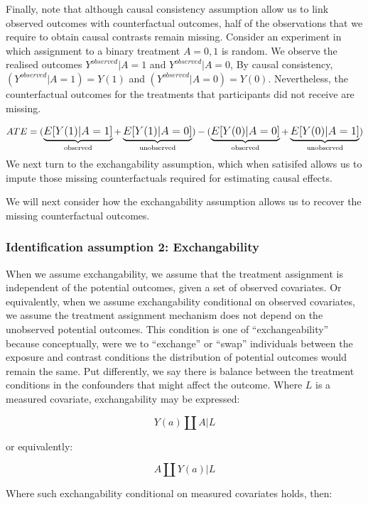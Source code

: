 \documentclass[
  singlecolumn]{report}
\begin{document}
Finally, note that although causal consistency assumption allow us to
link observed outcomes with counterfactual outcomes, half of the
observations that we require to obtain causal contrasts remain missing.
Consider an experiment in which assignment to a binary treatment
\(A = {0,1}\) is random. We observe the realised outcomes
\(Y^{observed}|A = 1\) and \(Y^{observed}|A = 0\), By causal
consistency, \((Y^{observed}|A = 1) = Y(1)\) and
\((Y^{observed}|A = 0) = Y(0)\). Nevertheless, the counterfactual
outcomes for the treatments that participants did not receive are
missing.

\[
ATE = \large(\underbrace{E[Y(1)|A = 1]}_\text{observed} + \underbrace{E[Y(1)|A = 0]}_\text{unobserved}\large) - \large(\underbrace{E[Y(0)|A = 0]}_\text{observed}  + \underbrace{E[Y(0)|A = 1]}_\text{unobserved}\large)
\] We next turn to the exchangability assumption, which when satisifed
allows us to impute those missing counterfactuals required for
estimating causal effects.

We will next consider how the exchangability assumption allows us to
recover the missing counterfactual outcomes.

\hypertarget{identification-assumption-2-exchangability}{%
\subsubsection{Identification assumption 2:
Exchangability}\label{identification-assumption-2-exchangability}}

When we assume exchangability, we assume that the treatment assignment
is independent of the potential outcomes, given a set of observed
covariates. Or equivalently, when we assume exchangability conditional
on observed covariates, we assume the treatment assignment mechanism
does not depend on the unobserved potential outcomes. This condition is
one of ``exchangeability'' because conceptually, were we to ``exchange''
or ``swap'' individuals between the exposure and contrast conditions the
distribution of potential outcomes would remain the same. Put
differently, we say there is balance between the treatment conditions in
the confounders that might affect the outcome. Where \(L\) is a measured
covariate, exchangability may be expressed:

\[Y(a)\coprod  A|L\]

or equivalently:

\[A \coprod  Y(a)|L\]

Where such exchangability conditional on measured covariates holds,
then:
\end{document}
